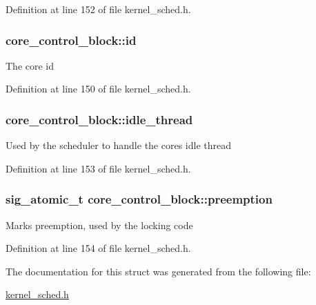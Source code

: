 Definition at line 152 of file kernel\+\_\+sched.\+h.

\subsubsection[{\texorpdfstring{id}{id}}]{ core\+\_\+control\+\_\+block\+::id}\hypertarget{structcore__control__block_a5208867f309bdd1656fd473f38b30bfe}{}\label{structcore__control__block_a5208867f309bdd1656fd473f38b30bfe}
The core id 

Definition at line 150 of file kernel\+\_\+sched.\+h.

\subsubsection[{\texorpdfstring{idle\+\_\+thread}{idle_thread}}]{ core\+\_\+control\+\_\+block\+::idle\+\_\+thread}\hypertarget{structcore__control__block_a6dd29dab4a95ce740f45370345408c52}{}\label{structcore__control__block_a6dd29dab4a95ce740f45370345408c52}
Used by the scheduler to handle the core\textquotesingle{}s idle thread 

Definition at line 153 of file kernel\+\_\+sched.\+h.

\subsubsection[{\texorpdfstring{preemption}{preemption}}]{\setlength{\rightskip}{0pt plus 5cm}sig\+\_\+atomic\+\_\+t core\+\_\+control\+\_\+block\+::preemption}\hypertarget{structcore__control__block_a858cde45d4478d73f60e839594b363f4}{}\label{structcore__control__block_a858cde45d4478d73f60e839594b363f4}
Marks preemption, used by the locking code 

Definition at line 154 of file kernel\+\_\+sched.\+h.



The documentation for this struct was generated from the following file\+:\begin{DoxyCompactItemize}
\item 
\hyperlink{kernel__sched_8h}{kernel\+\_\+sched.\+h}\end{DoxyCompactItemize}
